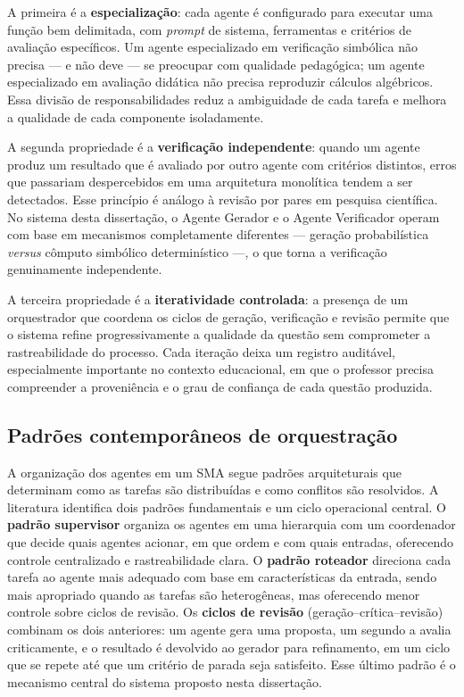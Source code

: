 A primeira é a \textbf{especialização}: cada agente é configurado para executar uma função bem
delimitada, com \emph{prompt} de sistema, ferramentas e critérios de avaliação específicos. Um agente
especializado em verificação simbólica não precisa --- e não deve --- se preocupar com qualidade
pedagógica; um agente especializado em avaliação didática não precisa reproduzir cálculos algébricos.
Essa divisão de responsabilidades reduz a ambiguidade de cada tarefa e melhora a qualidade de cada
componente isoladamente.

A segunda propriedade é a \textbf{verificação independente}: quando um agente produz um resultado que
é avaliado por outro agente com critérios distintos, erros que passariam despercebidos em uma
arquitetura monolítica tendem a ser detectados. Esse princípio é análogo à revisão por pares em
pesquisa científica. No sistema desta dissertação, o Agente Gerador e o Agente Verificador operam com
base em mecanismos completamente diferentes --- geração probabilística \emph{versus} cômputo simbólico
determinístico ---, o que torna a verificação genuinamente independente.

A terceira propriedade é a \textbf{iteratividade controlada}: a presença de um orquestrador que
coordena os ciclos de geração, verificação e revisão permite que o sistema refine progressivamente a
qualidade da questão sem comprometer a rastreabilidade do processo. Cada iteração deixa um registro
auditável, especialmente importante no contexto educacional, em que o professor precisa compreender a
proveniência e o grau de confiança de cada questão produzida.

\subsection{Padrões contemporâneos de orquestração}
\label{sub:orquestracao}

A organização dos agentes em um SMA segue padrões arquiteturais que determinam como as tarefas são
distribuídas e como conflitos são resolvidos. A literatura identifica dois padrões fundamentais e um
ciclo operacional central. O \textbf{padrão supervisor} organiza os agentes em uma hierarquia com um
coordenador que decide quais agentes acionar, em que ordem e com quais entradas, oferecendo controle
centralizado e rastreabilidade clara. O \textbf{padrão roteador} direciona cada tarefa ao agente mais
adequado com base em características da entrada, sendo mais apropriado quando as tarefas são
heterogêneas, mas oferecendo menor controle sobre ciclos de revisão. Os \textbf{ciclos de revisão}
(geração--crítica--revisão) combinam os dois anteriores: um agente gera uma proposta, um segundo a
avalia criticamente, e o resultado é devolvido ao gerador para refinamento, em um ciclo que se repete
até que um critério de parada seja satisfeito. Esse último padrão é o mecanismo central do sistema
proposto nesta dissertação.

